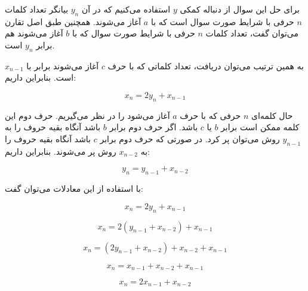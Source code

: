 
\p
    برای حل این سوال از دنباله کمکی $y$ استفاده می‌کنیم که در آن $y_n$ بیانگر تعداد کلمات $n$ حرفی با شرایط صورت سوال است که با $a$ آغاز می‌شوند. همچنین طبق اصل تقارن می‌توان گفت، تعداد کلمات $n$ حرفی با شرایط صورت سوال که با $b$ آغاز می‌شوند هم برابر $y_n$ است.
    
    به همین ترتیب می‌توان دریافت، تعداد کلماتی که با حرف $c$ آغاز می‌شوند برابر با $x_{n-1}$ است. بنابراین داریم:
    
    $$x_n=2y_n+x_{n-1}$$
    
    حال کلمه‌ای $n$ حرفی که با حرف $a$ آغاز می‌شود را در نظر می‌گیریم. حرف دوم این کلمه ممکن است برابر $b$ یا $c$ باشد. اگر حرف دوم برابر $b$ باشد آنگاه بقیه حروف را به $y_{n-1}$ روش می‌توان پر کرد. در صورتی که حرف دوم برابر $c$ باشد آنگاه بقیه حروف را به $x_{n-2}$ روش پر می‌شوند. بنابراین داریم:
    
    $$y_n=y_{n-1}+x_{n-2}$$
    
    با استفاده از این معادلات می‌توان گفت:
    
    $$x_n=2y_n+x_{n-1}$$
    
    $$x_n=2(y_{n-1}+x_{n-2})+x_{n-1}$$
    
    $$x_n=(2y_{n-1}+x_{n-2})+x_{n-2}+x_{n-1}$$
    
    $$x_n=x_{n-1}+x_{n-2}+x_{n-1}$$
    
    $$x_n=2x_{n-1}+x_{n-2}$$
